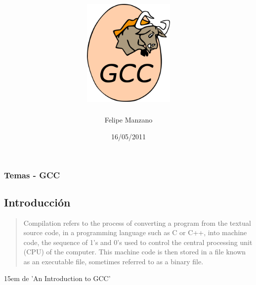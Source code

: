 \documentclass[xetex]{beamer}
\title{\includegraphics[width=6em]{gccegg.pdf}}
\author{Felipe Manzano}
\institute{Machinalis}
\date{16/05/2011}
\begin{document}
{
\begin{frame}{}\end{frame}
}

\begin{frame}
  \titlepage
\end{frame}

\begin{frame}
\frametitle{Temas - GCC}
\tableofcontents
\end{frame}

\begin{frame}{}
\section{Introducción}

\begin{quotation}
Compilation refers to the process of converting a program from the
textual source code, in a programming language such as C or C++, into
machine code, the sequence of 1's and 0's used to control the central
processing unit (CPU) of the computer. This machine code is then stored
in a file known as an executable file, sometimes referred to as a binary
file.
\end{quotation}
{\hglue 15em de 'An Introduction to GCC'}
\end{frame}
\end{document}
